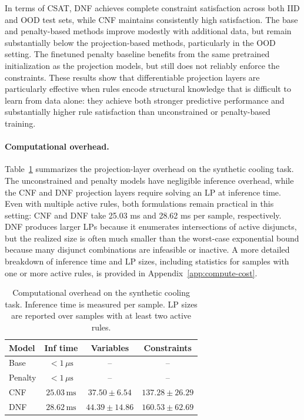 \documentclass{article}
\theoremstyle{plain}
\theoremstyle{definition}
\theoremstyle{remark}
\begin{document}
In terms of CSAT, DNF achieves complete constraint satisfaction across both IID and OOD test sets, while CNF maintains consistently high satisfaction. The base and penalty-based methods improve modestly with additional data, but remain substantially below the projection-based methods, particularly in the OOD setting. The finetuned penalty baseline benefits from the same pretrained initialization as the projection models, but still does not reliably enforce the constraints. These results show that differentiable projection layers are particularly effective when rules encode structural knowledge that is difficult to learn from data alone: they achieve both stronger predictive performance and substantially higher rule satisfaction than unconstrained or penalty-based training.

\paragraph{Computational overhead.}
Table~\ref{tab:main-compute} summarizes the projection-layer overhead on the synthetic cooling task. The unconstrained and penalty models have negligible inference overhead, while the CNF and DNF projection layers require solving an LP at inference time. Even with multiple active rules, both formulations remain practical in this setting: CNF and DNF take 25.03 ms and 28.62 ms per sample, respectively. DNF produces larger LPs because it enumerates intersections of active disjuncts, but the realized size is often much smaller than the worst-case exponential bound because many disjunct combinations are infeasible or inactive. A more detailed breakdown of inference time and LP sizes, including statistics for samples with one or more active rules, is provided in Appendix~\ref{app:compute-cost}.

\begin{table}
\centering
\caption{Computational overhead on the synthetic cooling task. Inference time is measured per sample. LP sizes are reported over samples with at least two active rules.}
\label{tab:main-compute}
\begin{tabular}{lccc}
\toprule
Model & Inf time & Variables & Constraints \\
\midrule
Base & $<1\,\mu\mathrm{s}$ & -- & -- \\
Penalty & $<1\,\mu\mathrm{s}$ & -- & -- \\
CNF & $25.03\,\mathrm{ms}$ & $37.50 \pm 6.54$ & $137.28 \pm 26.29$ \\
DNF & $28.62\,\mathrm{ms}$ & $44.39 \pm 14.86$ & $160.53 \pm 62.69$ \\
\bottomrule
\end{tabular}
\end{table}
\end{document}
